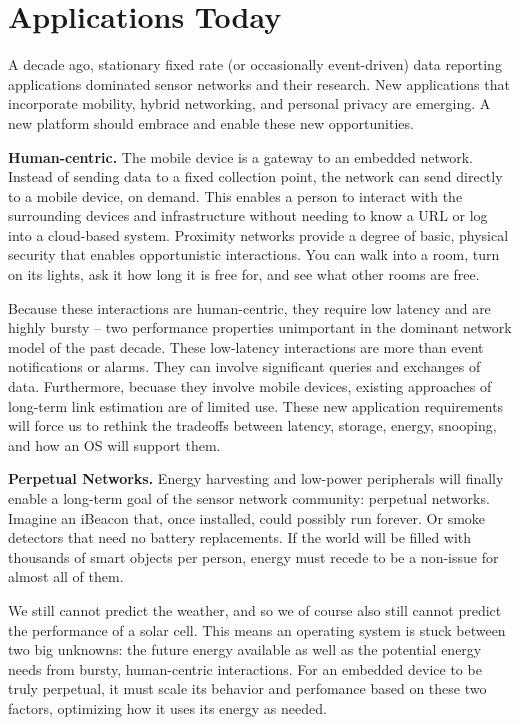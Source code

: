 \section{Applications Today}

A decade ago, stationary fixed rate (or occasionally event-driven) data 
reporting applications dominated sensor networks and their research. 
New applications that incorporate mobility, hybrid networking, and 
personal privacy are emerging. A new platform should embrace and enable 
these new opportunities.

\smallskip\noindent
\textbf{Human-centric.}
The mobile device is a gateway to an embedded network. Instead of
sending data to a fixed collection point, the network can send directly
to a mobile device, on demand. This enables a person to interact with
the surrounding devices and infrastructure without needing to know a
URL or log into a cloud-based system. Proximity networks provide a degree
of basic, physical security that enables opportunistic interactions.
You can walk into a room, turn on its lights, ask it how long it is free for,
and see what other rooms are free.

Because these interactions are human-centric, they require low latency and
are highly bursty -- two performance properties unimportant in the
dominant network model of the past decade. These low-latency interactions
are more than event notifications or alarms. They can involve significant
queries and exchanges of data. Furthermore, becuase they involve mobile
devices, existing approaches of long-term link estimation are of limited use.
These new application requirements will force us to rethink the tradeoffs
between latency, storage, energy, snooping, and how an OS will support them.

\smallskip\noindent
\textbf{Perpetual Networks.}
Energy harvesting and low-power peripherals will finally enable a
long-term goal of the sensor network community: perpetual networks. Imagine
an iBeacon that, once installed, could possibly run forever. Or smoke detectors that need no battery replacements. If the world will be filled with
thousands of smart objects per person, energy must recede to be a non-issue
for almost all of them.

We still cannot predict the weather, and so we of course also still cannot
predict the performance of a solar cell. This means an operating system
is stuck between two big unknowns: the future energy available as well as
the potential energy needs from bursty, human-centric interactions. For
an embedded device to be truly perpetual, it must scale its behavior and
perfomance based on these two factors, optimizing how it uses its energy
as needed.

